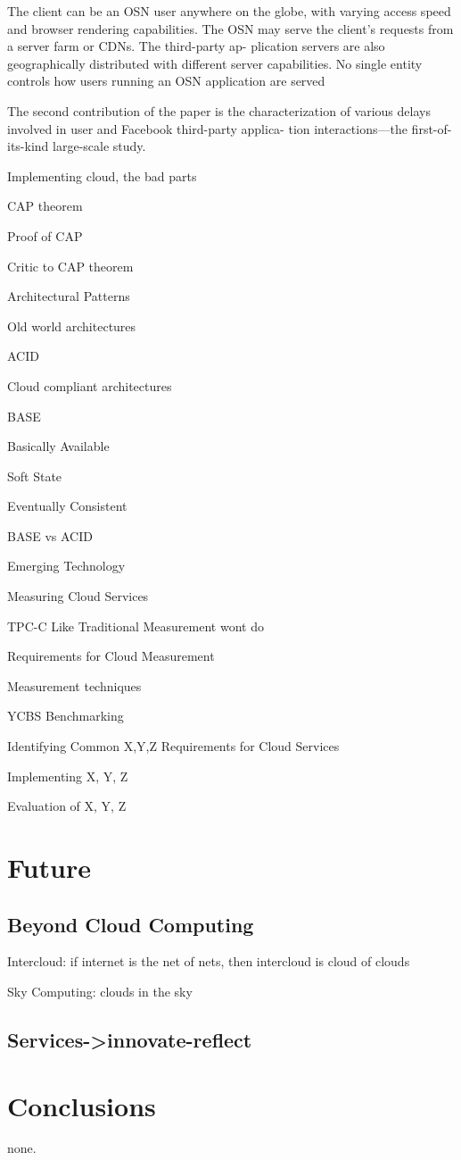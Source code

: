 \documentclass{tktltiki}
\begin{document}
The client can be an OSN user anywhere on the globe, with varying access speed and browser rendering capabilities. The OSN may serve the client’s requests from a server farm or CDNs. The third-party ap- plication servers are also geographically distributed with different server capabilities. No single entity controls how users running an OSN application are served

The second contribution of the paper is the characterization of
various delays involved in user and Facebook third-party applica- tion interactions—the first-of-its-kind large-scale study.





Implementing cloud, the bad parts

CAP theorem

Proof of CAP

Critic to CAP theorem

Architectural Patterns

Old world architectures

ACID

Cloud compliant architectures

BASE

Basically Available

Soft State

Eventually Consistent

BASE vs ACID

Emerging Technology

Measuring Cloud Services

TPC-C Like Traditional Measurement wont do

Requirements for Cloud Measurement

Measurement techniques

YCBS Benchmarking

Identifying Common X,Y,Z Requirements for Cloud Services

Implementing X, Y, Z

Evaluation of X, Y, Z




\section{Future}

\subsection{Beyond Cloud Computing}

Intercloud: if internet is the net of nets, then intercloud is cloud of clouds

Sky Computing: clouds in the sky

\subsection{Services->innovate-reflect}


\section{Conclusions}

none.





    
\end{document}
